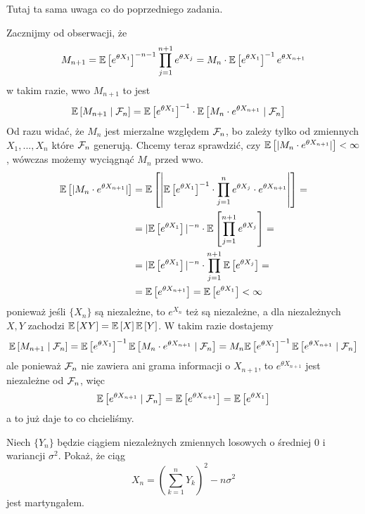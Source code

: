 \begin{solution}
  {\color{red}Tutaj ta sama uwaga co do poprzedniego zadania.}

  Zacznijmy od obserwacji, że
  $$M_{n+1}=\expected{e^{\theta X_1}}^{-n-1}\prod_{j=1}^{n+1}e^{\theta X_j}=M_n\cdot\expected{e^{\theta X_1}}^{-1}e^{\theta X_{n+1}}$$
  w takim razie, wwo $M_{n+1}$ to jest
  \begin{align*}
    \expected{M_{n+1}}{\set{F}_n}&=\expected{e^{\theta X_1}}^{-1}\cdot \expected{M_n\cdot e^{\theta X_{n+1}}}{\set{F}_n}
  \end{align*}
  Od razu widać, że $M_n$ jest mierzalne względem $\mathcal{F}_n$, bo zależy tylko od zmiennych $X_1,...,X_n$ które $\mathcal{F}_n$ generują. Chcemy teraz sprawdzić, czy $\expected{|M_n\cdot e^{\theta X_{n+1}}|}<\infty$, wówczas możemy wyciągnąć $M_n$ przed wwo.
  \begin{align*}
    \expected{|M_n\cdot e^{\theta X_{n+1}}|}&=\expected{\left |\expected{e^{\theta X_1}}^{-1}\cdot \prod_{j=1}^{n} e^{\theta X_j}\cdot e^{\theta X_{n+1}} \right| }=\\ 
                                            &=|\expected{e^{\theta X_1}}|^{-n}\cdot\expected{ \prod_{j=1}^{n+1}e^{\theta X_j} }=\\ 
                                            &=|\expected{e^{\theta X_1}}|^{-n}\cdot \prod_{j=1}^{n+1}\expected{e^{\theta X_j}}=\\ 
                                            &=\expected{e^{\theta X_{n+1}}}=\expected{e^{\theta X_1}}<\infty
  \end{align*}
  ponieważ jeśli $\{X_n\}$ są niezależne, to $e^{X_n}$ też są niezależne, a dla niezależnych $X,Y$ zachodzi $\expected{XY}=\expected{X}\expected{Y}$.
  W takim razie dostajemy
  $$\expected{M_{n+1}}{\set{F}_n}=\expected{e^{\theta X_1}}^{-1}\expected{M_n\cdot e^{\theta X_{n+1}}}{\set{F}_n}=M_n\expected{e^{\theta X_1}}^{-1}\expected{e^{\theta X_{n+1}}}{\set{F}_{n}}$$
  ale ponieważ $\mathcal{F}_n$ nie zawiera ani grama informacji o $X_{n+1}$, to $e^{\theta X_{n+1}}$ jest niezależne od $\mathcal{F}_n$, więc
  $$\expected{e^{\theta X_{n+1}}}{\set{F}_n}=\expected{e^{\theta X_{n+1}}}=\expected{e^{\theta X_1}}$$
    a to już daje to co chcieliśmy.
\end{solution}

\begin{problem}
  Niech $\{Y_n\}$ będzie ciągiem niezależnych zmiennych losowych o średniej $0$ i wariancji $\sigma^2$. Pokaż, że ciąg 
  $$X_n=\left(\sum_{k=1}^nY_k\right)^2-n\sigma^2$$
  jest martyngałem.
\end{problem}

